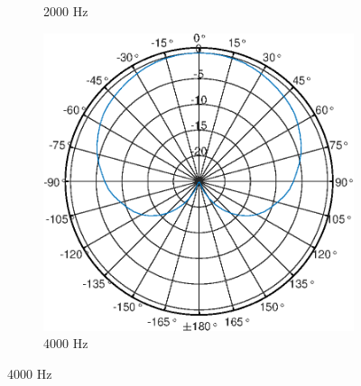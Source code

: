 \begin{figure}[b]
\begin{subfigure}{.33\textwidth}
        \caption{2000 Hz}
        \label{fig:Polar_2000}
    \end{subfigure}
    \begin{subfigure}{.33\textwidth}
        \centering
        \includegraphics[width=0.95\linewidth]{Figures/KM184_4000Hz}
        \caption{4000 Hz}
        \label{fig:Polar_4000}
    \end{subfigure}
\end{figure}


